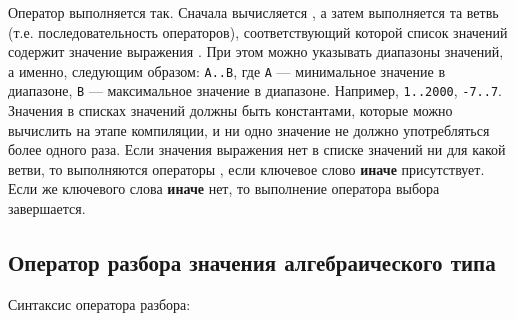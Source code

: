\documentclass[10pt]{report}
\begin{document}
Оператор выполняется так. Сначала вычисляется \textcolor{Green}{}, а затем выполняется та ветвь (т.е. последовательность операторов),
соответствующий которой список значений содержит значение выражения \textcolor{Green}{}. При этом можно указывать диапазоны значений,
а именно, следующим образом: \texttt{A..B}, где \texttt{A} --- минимальное значение в диапазоне, \texttt{B} --- максимальное значение в диапазоне. Например,
\texttt{1..2000}, \texttt{-7..7}. Значения в списках значений должны быть константами, которые можно вычислить на этапе компиляции, и ни одно значение не должно употребляться
более одного раза. Если значения выражения \textcolor{Green}{} нет в списке значений ни для какой ветви, то выполняются операторы
\textcolor{Green}{}, если ключевое слово \textbf{иначе} присутствует. Если же ключевого слова \textbf{иначе} нет, то выполнение оператора выбора
завершается.

    \subsection{Оператор разбора значения алгебраического типа}
Синтаксис оператора разбора:

\textcolor{Green}{}
\end{document}
